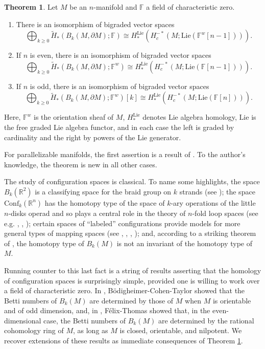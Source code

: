 \documentclass{compositio}
\theoremstyle{definition}\newtheorem{definition}{Definition}[section]
\theoremstyle{theorem}\newtheorem{lemma}[definition]{Lemma}
\theoremstyle{remark}\newtheorem*{conventions}{Conventions}
\theoremstyle{remark}\newtheorem*{acknowledgments}{Acknowledgments}
\theoremstyle{remark}\newtheorem*{outline}{Outline}
\theoremstyle{remark}\newtheorem*{questions}{Questions}
\theoremstyle{remark}\newtheorem{example}[definition]{Example}
\theoremstyle{definition}\newtheorem{construction}[definition]{Construction}
\theoremstyle{definition}\newtheorem*{convention}{Convention}
\theoremstyle{definition}\newtheorem*{conjecture}{Conjecture}
\theoremstyle{theorem}\newtheorem{theorem}[definition]{Theorem}
\theoremstyle{theorem}\newtheorem{paradigm}[definition]{Paradigm}
\theoremstyle{remark}\newtheorem{remark}[definition]{Remark}
\theoremstyle{corollary}\newtheorem{corollary}[definition]{Corollary}
\theoremstyle{theorem}\newtheorem{proposition}[definition]{Proposition}
\theoremstyle{definition}\newtheorem{question}[definition]{Question}
\begin{document}
\begin{theorem}\label{with grading} Let $M$ be an $n$-manifold and $\mathbb{F}$ a field of characteristic zero. \begin{enumerate}
\item There is an isomorphism of bigraded vector spaces $$\bigoplus_{k\geq0}\widetilde{H}_*(B_k(M,\partial M);\mathbb{F})\cong H_*^{\mathrm{Lie}}(H_{c}^{-*}(M;{\mathrm{Lie}}(\mathbb{F}^w[n-1]))).$$
\item If $n$ is even, there is an isomorphism of bigraded vector spaces $$\bigoplus_{k\geq0}\widetilde{H}_*(B_k(M,\partial M);\mathbb{F}^w)\cong H_*^{\mathrm{Lie}}(H_{c}^{-*}(M;{\mathrm{Lie}}(\mathbb{F}[n-1]))).$$
\item If $n$ is odd, there is an isomorphism of bigraded vector spaces $$\bigoplus_{k\geq0}\widetilde{H}_*(B_k(M,\partial M);\mathbb{F}^w)[k]\cong H_*^{\mathrm{Lie}}(H_{c}^{-*}(M;{\mathrm{Lie}}(\mathbb{F}[n]))).$$
\end{enumerate}
Here, $\mathbb{F}^w$ is the orientation sheaf of $M$, $H_*^{\mathrm{Lie}}$ denotes Lie algebra homology, ${\mathrm{Lie}}$ is the free graded Lie algebra functor, and in each case the left is graded by cardinality and the right by powers of the Lie generator.
\end{theorem}

For parallelizable manifolds, the first assertion is a result of \cite{Francis}. To the author's knowledge, the theorem is new in all other cases.

The study of configuration spaces is classical. To name some highlights, the space $B_k(\mathbb{R}^2)$ is a classifying space for the braid group on $k$ strands (see \cite{Artin}); the space ${\mathrm{Conf}}_k(\mathbb{R}^n)$ has the homotopy type of the space of $k$-ary operations of the little $n$-disks operad and so plays a central role in the theory of $n$-fold loop spaces (see e.g. \cite{CLM}, \cite{May}, \cite{Segal}); certain spaces of ``labeled'' configurations provide models for more general types of mapping spaces (see \cite{Bodigheimer}, \cite{McDuff}, \cite{Salvatore}, \cite{Segal}); and, according to a striking theorem of \cite{LS}, the homotopy type of $B_k(M)$ is not an invariant of the homotopy type of $M$. 

Running counter to this last fact is a string of results asserting that the homology of configuration spaces is surprisingly simple, provided one is willing to work over a field of characteristic zero. In \cite{BCT}, B\"{o}digheimer-Cohen-Taylor showed that the Betti numbers of $B_k(M)$ are determined by those of $M$ when $M$ is orientable and of odd dimension, and, in \cite{FT}, F\'{e}lix-Thomas showed that, in the even-dimensional case, the Betti numbers of $B_k(M)$ are determined by the rational cohomology ring of $M$, as long as $M$ is closed, orientable, and nilpotent. We recover extensions of these results as immediate consequences of Theorem \ref{with grading}.
\end{document}
